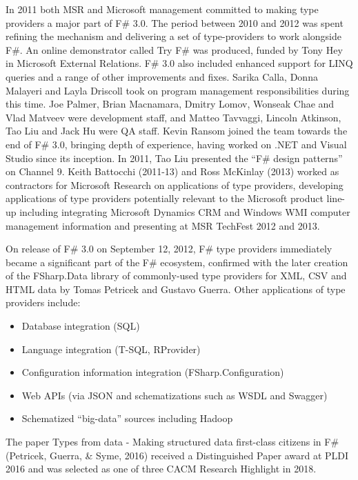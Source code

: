 \documentclass[acmsmall,review]{acmart}\settopmatter{printfolios=true,printccs=false,printacmref=false}
\begin{document}
In 2011 both MSR and Microsoft management committed to making type providers a major part of F\# 3.0. The period between 2010 and 2012 was spent refining the mechanism and delivering a set of type-providers to work alongside F\#. An online demonstrator called Try F\# was produced, funded by Tony Hey in Microsoft External Relations. F\# 3.0 also included enhanced support for LINQ queries and a range of other improvements and fixes. Sarika Calla, Donna Malayeri and Layla Driscoll took on program management responsibilities during this time.  Joe Palmer, Brian Macnamara, Dmitry Lomov, Wonseak Chae and Vlad Matveev were development staff, and Matteo Tavvaggi, Lincoln Atkinson, Tao Liu and Jack Hu were QA staff. Kevin Ransom joined the team towards the end of F\# 3.0, bringing depth of experience, having worked on .NET and Visual Studio since its inception. In 2011, Tao Liu presented the “F\# design patterns” on Channel 9. Keith Battocchi (2011-13) and Ross McKinlay (2013) worked as contractors for Microsoft Research on applications of type providers, developing applications of type providers potentially relevant to the Microsoft product line-up including integrating Microsoft Dynamics CRM and Windows WMI computer management information and presenting at MSR TechFest 2012 and 2013. 

On release of F\# 3.0 on September 12, 2012,  F\# type providers immediately became a significant part of the F\# ecosystem, confirmed with the later creation of the FSharp.Data library of commonly-used type providers for XML, CSV and HTML data by Tomas Petricek and Gustavo Guerra.  Other applications of type providers include:

\begin{itemize}
\item Database integration (SQL)
\item Language integration (T-SQL, RProvider)
\item Configuration information integration (FSharp.Configuration)
\item Web APIs (via JSON and schematizations such as WSDL and Swagger)
\item Schematized “big-data” sources including Hadoop
\end{itemize}

The paper Types from data - Making structured data first-class citizens in F\# (Petricek, Guerra, \& Syme, 2016) received a Distinguished Paper award at PLDI 2016 and was selected as one of three CACM Research Highlight in 2018.
\end{document}
